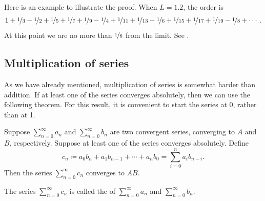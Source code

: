 \begin{example}
Here is an example to illustrate the proof.  When $L=1.2$, the order
is
\begin{equation*}
1+\nicefrac{1}{3}-\nicefrac{1}{2}+\nicefrac{1}{5}+\nicefrac{1}{7}+\nicefrac{1}{9}-\nicefrac{1}{4}+\nicefrac{1}{11}+\nicefrac{1}{13}-\nicefrac{1}{6}
+\nicefrac{1}{15}+\nicefrac{1}{17}+\nicefrac{1}{19} - \nicefrac{1}{8} + \cdots .
\end{equation*}
At this point we are no more than $\nicefrac{1}{8}$ from the limit.
See .
\begin{myfigureht}
\caption{The first 14 partial sums of the rearrangement converging
to $1.2$.\label{fig:serrearrange}}
\end{myfigureht}
\end{example}

\subsection{Multiplication of series}

As we have
already mentioned,
multiplication of series is somewhat harder than addition.
If at least one of the series converges
absolutely, then we can use the following theorem.  For this result, it is
convenient to start the series at 0, rather than at 1.

\begin{thm}
Suppose $\sum_{n=0}^\infty a_n$ and $\sum_{n=0}^\infty b_n$ are two convergent series, converging
to $A$ and $B$, respectively.  Suppose at least one of the series
converges absolutely.  Define
\begin{equation*}
c_n \coloneqq a_0 b_n + a_1 b_{n-1} + \cdots + a_n b_0 = \sum_{i=0}^n a_i b_{n-i} .
\end{equation*}
Then the series $\sum_{n=0}^\infty c_n$
converges to $AB$.
\end{thm}

The series $\sum_{n=0}^\infty c_n$ is called the \emph{} of
$\sum_{n=0}^\infty a_n$ and $\sum_{n=0}^\infty b_n$.

